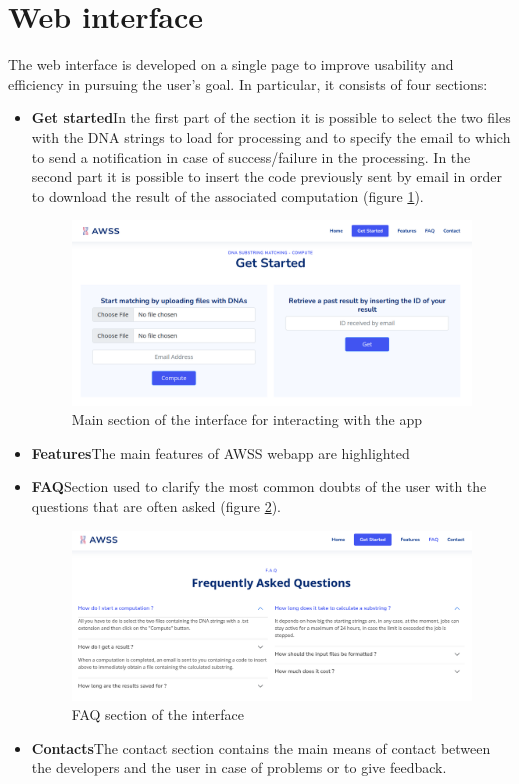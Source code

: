 \documentclass[a4paper,10pt, titlepage]{article}
\begin{document}
\section{Web interface}
The web interface is developed on a single page to improve usability and efficiency in pursuing the user's goal.
In particular, it consists of four sections:
\begin{itemize}
	\item \textbf{Get started}\newline In the first part of the section it is possible to select the two files with the DNA strings to load for processing and to specify the email to which to send a notification in case of success/failure in the processing. In the second part it is possible to insert the code previously sent by email in order to download the result of the associated computation (figure \ref{fig:compute}).
	\begin{figure}[H]
		\centering
		\includegraphics[width=\linewidth]{figures/compute.png}
		\caption{Main section of the interface for interacting with the app}
		\label{fig:compute}
	\end{figure}
	\item \textbf{Features}\newline The main features of AWSS webapp are highlighted
	\item \textbf{FAQ}\newline Section used to clarify the most common doubts of the user with the questions that are often asked (figure \ref{fig:faq}).
	\begin{figure}[H]
		\centering
		\includegraphics[width=\linewidth]{figures/faq.png}
		\caption{FAQ section of the interface}
		\label{fig:faq}
	\end{figure}
	\item \textbf{Contacts}\newline The contact section contains the main means of contact between the developers and the user in case of problems or to give feedback.
\end{itemize}
\end{document}
